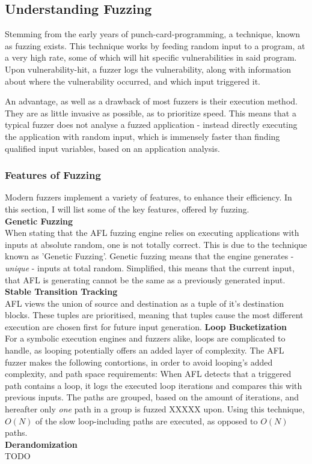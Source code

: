 \documentclass[a4paper]{article}
\newcommand{\tbf}[1]{\textbf{#1}}
\newcommand{\tit}[1]{\textit{#1}}
\begin{document}
\subsection{Understanding Fuzzing}
Stemming from the early years of punch-card-programming, a technique, known as fuzzing exists. This technique works by feeding random input to a program, at a very high rate, some of which will hit specific vulnerabilities in said program. Upon vulnerability-hit, a fuzzer logs the vulnerability, along with information about where the vulnerability occurred, and which input triggered it.

An advantage, as well as a drawback of most fuzzers is their execution method. They are as little invasive as possible, as to prioritize speed. This means that a typical fuzzer does not analyse a fuzzed application - instead directly executing the application with random input, which is immensely faster than finding qualified input variables, based on an application analysis.
\subsubsection*{Features of Fuzzing}

Modern fuzzers implement a variety of features, to enhance their efficiency. In this section, I will list some of the key features, offered by fuzzing.\\
\tbf{Genetic Fuzzing}\\
When stating that the AFL fuzzing engine relies on executing applications with inputs at absolute random, one is not totally correct. This is due to the technique known as 'Genetic Fuzzing'. Genetic fuzzing means that the engine generates - \tit{unique} - inputs at total random. Simplified, this means that the current input, that AFL is generating cannot be the same as a previously generated input.  
\tbf{Stable Transition Tracking}\\
AFL views the union of source and destination as a tuple of it's destination blocks.  These tuples are prioritised, meaning that tuples cause the most different execution are chosen first for future input generation.
\tbf{Loop Bucketization}\\
For a symbolic execution engines and fuzzers alike, loops are complicated to handle, as looping potentially offers an added layer of complexity. The AFL fuzzer makes the following contortions, in order to avoid looping's added complexity, and path space requirements:
When AFL detects that a triggered path contains a loop, it logs the executed loop iterations and compares this with previous inputs. The paths are grouped, based on the amount of iterations, and hereafter only \tit{one} path in a group is fuzzed XXXXX upon. Using this technique, $O(N)$ of the slow loop-including paths are executed, as opposed to $O(N)$ paths.\\
\tbf{Derandomization}\\
 TODO
\newpage
\end{document}
